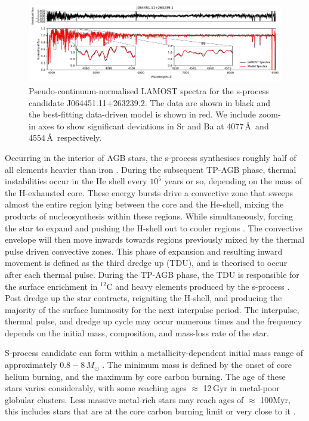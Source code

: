\documentclass[a4paper,fleqn,usenatbib]{mnras}
\begin{document}
\begin{figure}
	\includegraphics[width=\textwidth]{posterchild_final.pdf}
	\caption{Pseudo-continuum-normalised LAMOST spectra for the s-process candidate J064451.11+263239.2. The data are shown in black and the best-fitting data-driven model is shown in red. We include zoom-in axes to show significant deviations in Sr and Ba at  4077\,\AA\ and 4554\,\AA\, respectively.}
	\label{fig:figure1}
\end{figure}

Occurring in the interior of AGB stars, the s-process synthesises roughly half of all elements heavier than iron \citep[e.g.,][]{busso1999,travaglio2001,herwig2005,bisterzo2014,karakas2014}. During the subsequent TP-AGB phase, thermal instabilities occur in the He shell every $10^5$ years or so, depending on the mass of the H-exhausted core. These energy bursts drive a convective zone that sweeps almost the entire region lying between the core and the He-shell, mixing the products of nucleosynthesis within these regions. While simultaneously, forcing the star to expand and pushing the H-shell out to cooler regions \citep{karakas2002}. The convective envelope will then move inwards towards regions previously mixed by the thermal pulse driven convective zones. This phase of expansion and resulting inward movement is defined as the third dredge up (TDU), and is theorised to occur after each thermal pulse. During the TP-AGB phase, the TDU is responsible for the surface enrichment in $^{12}$C and heavy elements produced by the s-process \citep[e.g.,][]{busso2001}. Post dredge up the star contracts, reigniting the H-shell, and producing the majority of the surface luminosity for the next interpulse period. The interpulse, thermal pulse, and dredge up cycle may occur numerous times and the frequency depends on the initial mass, composition, and mass-loss rate of the star.

S-process candidate can form within a metallicity-dependent initial mass range of approximately $0.8 - 8\,M_{\odot}$ \citep{karakas2016cp}. The minimum mass is defined by the onset of core helium burning, and the maximum by core carbon burning. The age of these stars varies considerably, with some reaching ages $\approx$ 12\,Gyr in metal-poor globular clusters. Less massive metal-rich stars may reach ages of $\approx$ 100Myr, this includes stars that are at the core carbon burning limit or very close to it \citep[e.g.,][]{whitelock2013}. 
\end{document}
